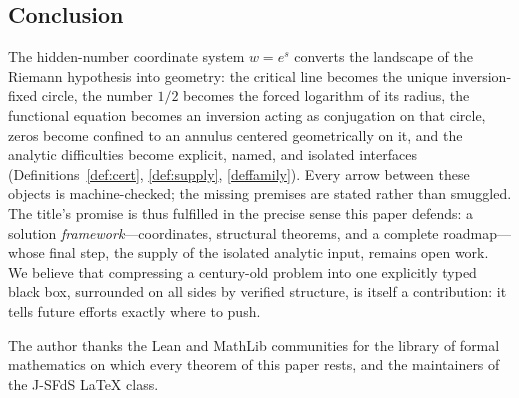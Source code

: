 \documentclass[submission]{jsfds}
\begin{document}
\subsection*{Conclusion}
The hidden-number coordinate system $w=e^{s}$ converts the landscape of the
Riemann hypothesis into geometry: the critical line becomes the unique
inversion-fixed circle, the number $1/2$ becomes the forced logarithm of its
radius, the functional equation becomes an inversion acting as conjugation on
that circle, zeros become confined to an annulus centered geometrically on it,
and the analytic difficulties become explicit, named, and isolated interfaces
(Definitions~\ref{def:cert}, \ref{def:supply},
\ref{deffamily}). Every arrow between these objects is machine-checked; the
missing premises are stated rather than smuggled. The title's promise is thus
fulfilled in the precise sense this paper defends: a solution
\emph{framework}---coordinates, structural theorems, and a complete
roadmap---whose final step, the supply of the isolated analytic input, remains
open work. We believe that compressing a century-old problem into one
explicitly typed black box, surrounded on all sides by verified structure, is
itself a contribution: it tells future efforts exactly where to push.

\begin{acknowledgement}
The author thanks the Lean and MathLib communities for the library of formal
mathematics on which every theorem of this paper rests, and the maintainers of
the J-SFdS \LaTeX{} class.
\end{acknowledgement}


\end{document}
